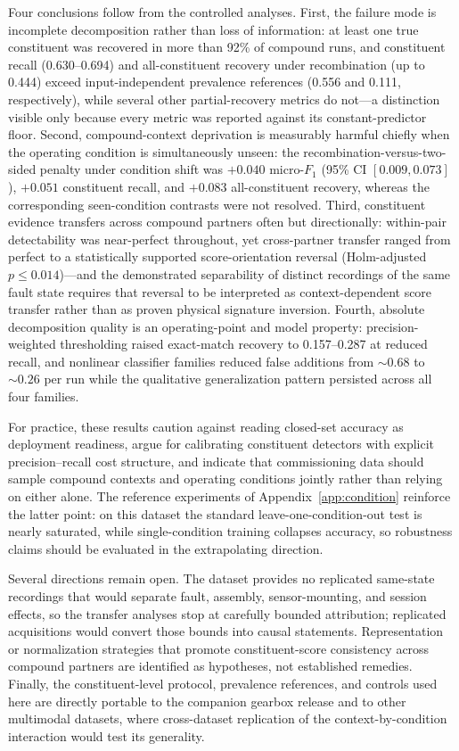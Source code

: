 Four conclusions follow from the controlled analyses. First, the failure
mode is incomplete decomposition rather than loss of information: at least
one true constituent was recovered in more than 92\% of compound runs, and
constituent recall (0.630--0.694) and all-constituent recovery under
recombination (up to 0.444) exceed input-independent prevalence references
(0.556 and 0.111, respectively), while several other partial-recovery
metrics do not---a distinction visible only because every metric was
reported against its constant-predictor floor. Second, compound-context
deprivation is measurably harmful chiefly when the operating condition is
simultaneously unseen: the recombination-versus-two-sided penalty under
condition shift was $+0.040$ micro-$F_1$ (95\% CI $[0.009, 0.073]$),
$+0.051$ constituent recall, and $+0.083$ all-constituent recovery, whereas
the corresponding seen-condition contrasts were not resolved. Third,
constituent evidence transfers across compound partners often but
directionally: within-pair detectability was near-perfect throughout, yet
cross-partner transfer ranged from perfect to a statistically supported
score-orientation reversal (Holm-adjusted $p \le 0.014$)---and the
demonstrated separability of distinct recordings of the same fault state
requires that reversal to be interpreted as context-dependent score
transfer rather than as proven physical signature inversion. Fourth,
absolute decomposition quality is an operating-point and model property:
precision-weighted thresholding raised exact-match recovery to 0.157--0.287
at reduced recall, and nonlinear classifier families reduced false additions
from ${\sim}0.68$ to ${\sim}0.26$ per run while the qualitative
generalization pattern persisted across all four families.

For practice, these results caution against reading closed-set accuracy as
deployment readiness, argue for calibrating constituent detectors with
explicit precision--recall cost structure, and indicate that commissioning
data should sample compound contexts and operating conditions jointly rather
than relying on either alone. The reference experiments of
Appendix~\ref{app:condition} reinforce the latter point: on this dataset the
standard leave-one-condition-out test is nearly saturated, while
single-condition training collapses accuracy, so robustness claims should be
evaluated in the extrapolating direction.

Several directions remain open. The dataset provides no replicated
same-state recordings that would separate fault, assembly, sensor-mounting,
and session effects, so the transfer analyses stop at carefully bounded
attribution; replicated acquisitions would convert those bounds into causal
statements. Representation or normalization strategies that promote
constituent-score consistency across compound partners are identified as
hypotheses, not established remedies. Finally, the constituent-level
protocol, prevalence references, and controls used here are directly
portable to the companion gearbox release and to other multimodal datasets,
where cross-dataset replication of the context-by-condition interaction
would test its generality.

